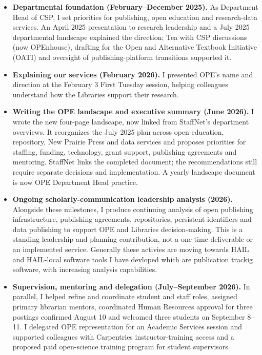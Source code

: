 \begin{itemize}
\item \textbf{Departmental foundation (February--December 2025).} As Department Head of CSP, I set priorities for publishing, open education and research-data services. An April 2025 presentation to research leadership and a July 2025 departmental landscape explained the direction; Tea with CSP discussions (now OPEnhouse), drafting for the Open and Alternative Textbook Initiative (OATI) and oversight of publishing-platform transitions supported it.
\item \textbf{Explaining our services (February 2026).} I presented OPE's name and direction at the February 3 First Tuesday session, helping colleagues understand how the Libraries support their research.
\item \textbf{Writing the OPE landscape and executive summary (June 2026).} I wrote the new four-page landscape, now linked from StaffNet's department overviews. It reorganizes the July 2025 plan across open education, repository, New Prairie Press and data services and proposes priorities for staffing, funding, technology, grant support, publishing agreements and mentoring. StaffNet links the completed document; the recommendations still require separate decisions and implementation. A yearly landscape document is now OPE Department Head practice.
\item \textbf{Ongoing scholarly-communication leadership analysis (2026).} Alongside these milestones, I produce continuing analysis of open publishing infrastructure, publishing agreements, repositories, persistent identifiers and data publishing to support OPE and Libraries decision-making. This is a standing leadership and planning contribution, not a one-time deliverable or an implemented service. Generally these activies are moving towards HAIL and HAIL-local software tools I have devloped which are publication trackig software, with increasing analysis capabilities.
\item \textbf{Supervision, mentoring and delegation (July--September 2026).} In parallel, I helped refine and coordinate student and staff roles, assigned primary librarian mentors, coordinated Human Resources approval for three postings confirmed August 10 and welcomed three students on September 8--11. I delegated OPE representation for an Academic Services session and supported colleagues with Carpentries instructor-training access and a proposed paid open-science training program for student supervisors.

\end{itemize}
